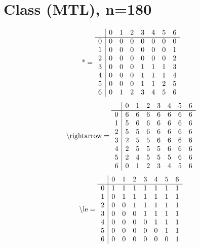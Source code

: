 \documentclass[11pt]{article}
\begin{document}
\section{Class (MTL), n=180}
\[\text{*} = 
\begin{array}{r | r r r r r r r}
 & 0 & 1 & 2 & 3 & 4 & 5 & 6 \\ \hline
0 & 0 & 0 & 0 & 0 & 0 & 0 & 0 \\
1 & 0 & 0 & 0 & 0 & 0 & 0 & 1 \\
2 & 0 & 0 & 0 & 0 & 0 & 0 & 2 \\
3 & 0 & 0 & 0 & 1 & 1 & 1 & 3 \\
4 & 0 & 0 & 0 & 1 & 1 & 1 & 4 \\
5 & 0 & 0 & 0 & 1 & 1 & 2 & 5 \\
6 & 0 & 1 & 2 & 3 & 4 & 5 & 6 \\
\end{array}
\]
\[\text{\textbackslash rightarrow} = 
\begin{array}{r | r r r r r r r}
 & 0 & 1 & 2 & 3 & 4 & 5 & 6 \\ \hline
0 & 6 & 6 & 6 & 6 & 6 & 6 & 6 \\
1 & 5 & 6 & 6 & 6 & 6 & 6 & 6 \\
2 & 5 & 5 & 6 & 6 & 6 & 6 & 6 \\
3 & 2 & 5 & 5 & 6 & 6 & 6 & 6 \\
4 & 2 & 5 & 5 & 5 & 6 & 6 & 6 \\
5 & 2 & 4 & 5 & 5 & 5 & 6 & 6 \\
6 & 0 & 1 & 2 & 3 & 4 & 5 & 6 \\
\end{array}
\]
\[\text{\textbackslash le} = 
\begin{array}{r | r r r r r r r}
 & 0 & 1 & 2 & 3 & 4 & 5 & 6 \\ \hline
0 & 1 & 1 & 1 & 1 & 1 & 1 & 1 \\
1 & 0 & 1 & 1 & 1 & 1 & 1 & 1 \\
2 & 0 & 0 & 1 & 1 & 1 & 1 & 1 \\
3 & 0 & 0 & 0 & 1 & 1 & 1 & 1 \\
4 & 0 & 0 & 0 & 0 & 1 & 1 & 1 \\
5 & 0 & 0 & 0 & 0 & 0 & 1 & 1 \\
6 & 0 & 0 & 0 & 0 & 0 & 0 & 1 \\
\end{array}
\]
\end{document}
